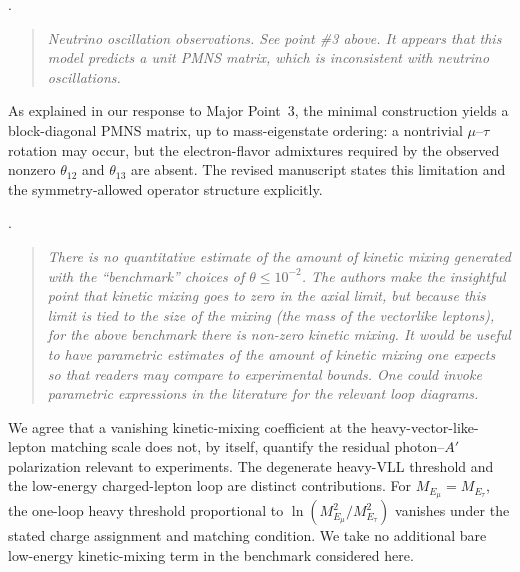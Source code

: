 \documentclass[12pt,a4paper]{article}
\begin{document}
\medskip
{}.
\begin{quote}\itshape
Neutrino oscillation observations. See point \#3 above. It appears that this model predicts a unit PMNS matrix, which is inconsistent with neutrino oscillations.
\end{quote}


As explained in our response to Major Point~3, the minimal construction yields a block-diagonal PMNS matrix, up to mass-eigenstate ordering: a nontrivial \(\mu\)--\(\tau\) rotation may occur, but the electron-flavor admixtures required by the observed nonzero \(\theta_{12}\) and \(\theta_{13}\) are absent. The revised manuscript states this limitation and the symmetry-allowed operator structure explicitly.

\medskip
{}.
\begin{quote}\itshape
There is no quantitative estimate of the amount of kinetic mixing generated with the ``benchmark'' choices of \(\theta\leq10^{-2}\). The authors make the insightful point that kinetic mixing goes to zero in the axial limit, but because this limit is tied to the size of the mixing (the mass of the vectorlike leptons), for the above benchmark there is non-zero kinetic mixing. It would be useful to have parametric estimates of the amount of kinetic mixing one expects so that readers may compare to experimental bounds. One could invoke parametric expressions in the literature for the relevant loop diagrams.
\end{quote}


We agree that a vanishing kinetic-mixing coefficient at the heavy-vector-like-lepton matching scale does not, by itself, quantify the residual photon--\(A'\) polarization relevant to experiments. The degenerate heavy-VLL threshold and the low-energy charged-lepton loop are distinct contributions. For \(M_{E_\mu}=M_{E_\tau}\), the one-loop heavy threshold proportional to \(\ln(M_{E_\mu}^2/M_{E_\tau}^2)\) vanishes under the stated charge assignment and matching condition. We take no additional bare low-energy kinetic-mixing term in the benchmark considered here.
\end{document}
